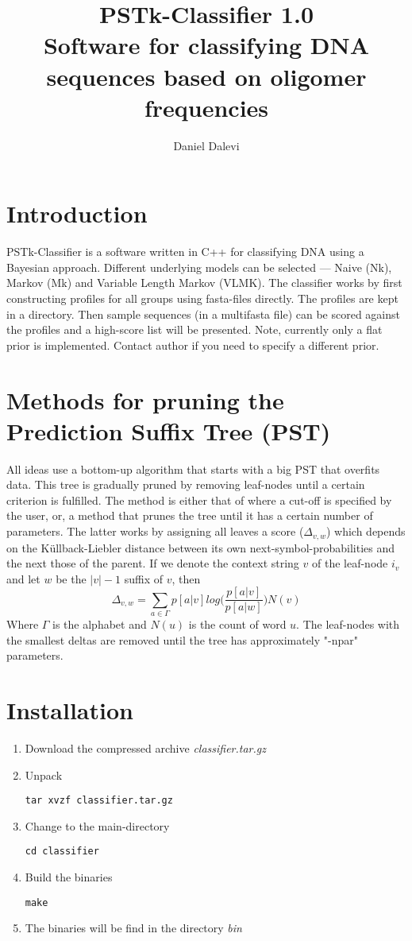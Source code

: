 \documentclass[]{article}
\title{PSTk-Classifier 1.0 \\Software for classifying DNA sequences based on
  oligomer frequencies}
\author{Daniel Dalevi}
\begin{document}
\maketitle
\section{Introduction}
 PSTk-Classifier is a software written in C++ for classifying DNA
using a Bayesian approach. Different underlying models can be
selected --- Naive (Nk), Markov (Mk) and Variable Length Markov
(VLMK). The classifier works by first constructing profiles for
all groups using fasta-files directly. The profiles are kept in
a directory. Then sample sequences (in a multifasta file) can be
scored against the profiles and a high-score list will be
presented. Note, currently only a flat prior is implemented. Contact author
if you need to specify a different prior.

\section{Methods for pruning the Prediction Suffix Tree (PST)}
All ideas use a bottom-up algorithm that starts with a big PST that
overfits data. This tree is gradually pruned by removing leaf-nodes until a
certain criterion is fulfilled. The method is either that of
\cite{BuhWyn1999} where a cut-off is specified by the user, or, a method
that prunes the tree until it has a certain number of parameters. The
latter \cite{DalDub2006} works by assigning all leaves a score ($\Delta_{v,w}$) which depends on the
K\"ullback-Liebler distance between its own next-symbol-probabilities and
the next those of the parent. If we denote the context string $v$ of the
leaf-node $i_v$ and let $w$ be the $|v|-1$ suffix of $v$, then
\begin{equation}
\Delta_{v,w} = \sum_{a \in \Gamma} p[ a | v ] log\Big(
\frac{p[a|v]}{p[a|w]} \Big) N( v )
\end{equation}
Where $\Gamma$ is the alphabet and $N(u)$ is the count of word $u$. The leaf-nodes with the smallest deltas are removed until the tree has
approximately "-npar" parameters.

\section{Installation}
\begin{enumerate}
\item Download the compressed archive \textit{classifier.tar.gz}
\item Unpack 
\begin{verbatim}
tar xvzf classifier.tar.gz
\end{verbatim}
\item Change to the main-directory
\begin{verbatim}
cd classifier
\end{verbatim}
\item Build the binaries
\begin{verbatim}
make
\end{verbatim}
\item The binaries will be find in the directory \textit{bin}
\end{enumerate}
\end{document}
